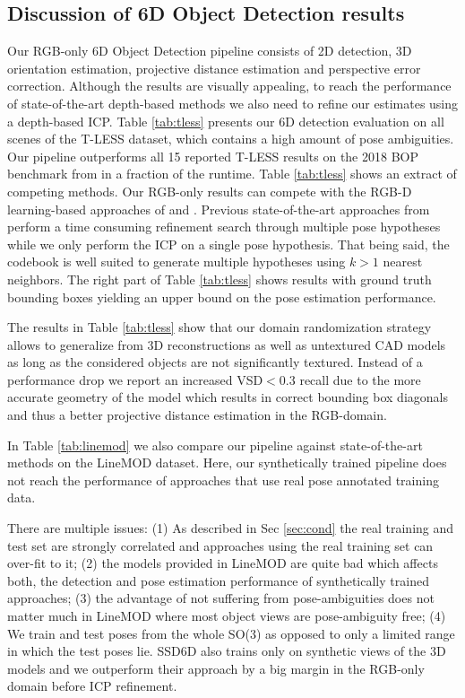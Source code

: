 {{	\subsection{Discussion of 6D Object Detection results}
	Our RGB-only 6D Object Detection pipeline consists of 2D detection, 3D orientation estimation, projective distance estimation and perspective error correction. Although the results are visually appealing, to reach the performance of state-of-the-art depth-based methods we also need to refine our estimates using a depth-based \gls{ICP}. 
	Table \ref{tab:tless} presents our 6D detection evaluation on all scenes of the T-LESS dataset, which contains a high amount of pose ambiguities. Our pipeline outperforms all 15 reported T-LESS results on the 2018 BOP benchmark from \cite{hodan2018bop} in a fraction of the runtime. Table \ref{tab:tless} shows an extract of competing methods. Our RGB-only results can compete with the RGB-D learning-based approaches of \cite{brachmann2016uncertainty} and \cite{kehl2016deep}. Previous state-of-the-art approaches from \cite{vidal20186d,drost2010model} perform a time consuming refinement search through multiple pose hypotheses while we only perform the ICP on a single pose hypothesis. That being said, the codebook is well suited to generate multiple hypotheses using $k>1$ nearest neighbors. The right part of Table \ref{tab:tless} shows results with ground truth bounding boxes yielding an upper bound on the pose estimation performance.
	
	The results in Table \ref{tab:tless} show that our domain randomization strategy allows to generalize from 3D reconstructions as well as untextured CAD models as long as the considered objects are not significantly textured. Instead of a performance drop we report an increased \gls{VSD}$<0.3$ recall due to the more accurate geometry of the model which results in correct bounding box diagonals and thus a better projective distance estimation in the RGB-domain.
	
	In Table \ref{tab:linemod} we also compare our pipeline against state-of-the-art methods on the LineMOD dataset. Here, our synthetically trained pipeline does not reach the performance of approaches that use real pose annotated training data. 
	
	
	There are multiple issues: (1) As described in Sec \ref{sec:cond} the real training and test set are strongly correlated and approaches using the real training set can over-fit to it; (2) the models provided in LineMOD are quite bad which affects both, the detection and pose estimation performance of synthetically trained approaches; (3) the advantage of not suffering from pose-ambiguities does not matter much in LineMOD where most object views are pose-ambiguity free; (4) We train and test poses from the whole SO(3) as opposed to only a limited range in which the test poses lie.
	SSD6D also trains only on synthetic views of the 3D models and we outperform their approach by a big margin in the RGB-only domain before \gls{ICP} refinement. 
	
}}
